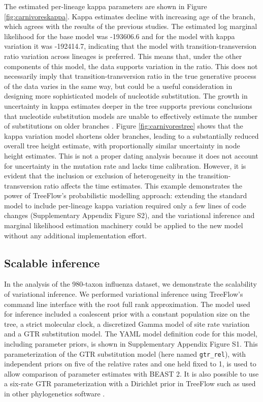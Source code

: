 \documentclass[oupdraft]{sysbio_sse}
\let\cite\citep
\begin{document}
The estimated per-lineage kappa parameters are shown in Figure \ref{fig:carnivoreskappa}. Kappa estimates decline with increasing age of the branch, which agrees with the results of the previous studies. The estimated log marginal likelihood for the base model was -193606.6 and for the model with kappa variation it was -192414.7, indicating that the model with transition-transversion ratio variation across lineages is preferred. This means that, under the other components of this model, the data supports variation in the ratio. This does not necessarily imply that transition-transversion ratio in the true generative process of the data varies in the same way, but could be a useful consideration in designing more sophisticated models of nucleotide substitution. The growth in uncertainty in kappa estimates deeper in the tree supports previous conclusions that nucleotide substitution models are unable to effectively estimate the number of substitutions on older branches \cite{duchene2015declining}. Figure \ref{fig:carnivorestree} shows that the kappa variation model shortens older branches, leading to a substantially reduced overall tree height estimate, with proportionally similar uncertainty in node height estimates. This is not a proper dating analysis because it does not account for uncertainty in the mutation rate and lacks time calibration. However, it is evident that the inclusion or exclusion of heterogeneity in the transition-transversion ratio affects the time estimates. This example demonstrates the power of TreeFlow's probabilistic modelling approach: extending the standard model to include per-lineage kappa variation required only a few lines of code changes (Supplementary Appendix Figure S2), and the variational inference and marginal likelihood estimation machinery could be applied to the new model without any additional implementation effort.


\subsection{Scalable inference}

In the analysis of the 980-taxon influenza dataset, we demonstrate the scalability of variational inference. We performed variational inference using TreeFlow's command line interface with the root full rank approximation. The model used for inference included a coalescent prior with a constant population size on the tree, a strict molecular clock, a discretized Gamma model of site rate variation and a GTR substitution model. The YAML model definition code for this model, including parameter priors, is shown in Supplementary Appendix Figure S1. This parameterization of the GTR substitution model (here named \texttt{gtr\_rel}), with independent priors on five of the relative rates and one held fixed to 1, is used to allow comparison of parameter estimates with BEAST 2. It is also possible to use a six-rate GTR parameterization with a Dirichlet prior in TreeFlow such as used in other phylogenetics software \cite{huelsenbeck2001mrbayes, hohna2016revbayes}.
\end{document}
